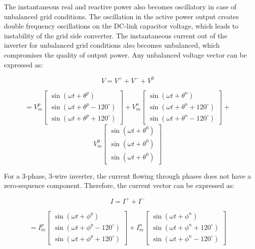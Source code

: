 \documentclass[conference]{IEEEtran}
\begin{document}
The instantaneous real and reactive power also becomes oscillatory in case of unbalanced grid conditions. The oscillation in the active power output creates double frequency oscillations on the DC-link capacitor voltage, which leads to instability of the grid side converter. The instantaneous current out of the inverter for unbalanced grid conditions also becomes unbalanced, which compromises the quality of output power.  
Any unbalanced voltage vector can be expressed as:

\begin{equation}
V = V^+ + V^- + V^0
\end{equation}

\begin{equation}
= V_m^p \begin{bmatrix} \sin(\omega t + \theta^p) \\ \sin(\omega t + \theta^p - 120^\circ) \\ \sin(\omega t + \theta^p + 120^\circ) \end{bmatrix} + V_m^n \begin{bmatrix} \sin(\omega t + \theta^n) \\ \sin(\omega t + \theta^n + 120^\circ) \\ \sin(\omega t + \theta^n - 120^\circ) \end{bmatrix} +\end{equation}
\[
 V_m^0 \begin{bmatrix} \sin(\omega t + \theta^0) \\ \sin(\omega t + \theta^0) \\ \sin(\omega t + \theta^0) \end{bmatrix}
\]




For a 3-phase, 3-wire inverter, the current flowing through phases does not have a zero-sequence component. Therefore, the current vector can be expressed as:

\begin{equation}
I = I^+ + I^- 
\end{equation}

\[
= I_m^p \begin{bmatrix} \sin(\omega t + \phi^p) \\ \sin(\omega t + \phi^p - 120^\circ) \\ \sin(\omega t + \phi^p + 120^\circ) \end{bmatrix} + I_m^n \begin{bmatrix} \sin(\omega t + \phi^n) \\ \sin(\omega t + \phi^n + 120^\circ) \\ \sin(\omega t + \phi^n - 120^\circ) \end{bmatrix}
\]
\end{document}
